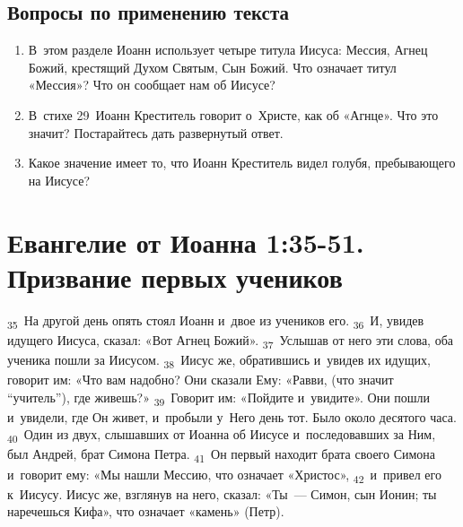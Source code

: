 \documentclass[a4paper,12pt]{article}
\begin{document}
\subsection*{Вопросы по применению текста} 
\begin{enumerate}
    \item В~этом разделе Иоанн использует четыре титула Иисуса: Мессия, Агнец Божий, крестящий Духом Святым, Сын Божий. Что означает титул «Мессия»? Что он сообщает нам об Иисусе? 
    
    \myline
    
    \myline
    \item В~стихе 29~Иоанн Креститель говорит о~Христе, как об «Агнце». Что это значит? Постарайтесь дать развернутый ответ. 
    
    \myline
    
    \myline
    \item Какое значение имеет то, что Иоанн Креститель видел голубя, пребывающего на Иисусе? 
    
    \myline
    
    \myline
\end{enumerate}



\section{Евангелие от Иоанна 1:35-51. Призвание первых учеников}

\textsubscript{35}~На другой день опять стоял Иоанн и~двое из учеников его. \textsubscript{36}~И, увидев идущего Иисуса, сказал: «Вот Агнец Божий». \textsubscript{37}~Услышав от него эти слова, оба ученика пошли за Иисусом. \textsubscript{38}~Иисус же, обратившись и~увидев их идущих, говорит им: «Что вам надобно? Они сказали Ему: «Равви, (что значит “учитель”), где живешь?» \textsubscript{39}~Говорит им: «Пойдите и~увидите». Они пошли и~увидели, где Он живет, и~пробыли у~Него день тот. Было около десятого часа. \textsubscript{40}~Один из двух, слышавших от Иоанна об Иисусе и~последовавших за Ним, был Андрей, брат Симона Петра. \textsubscript{41}~Он первый находит брата своего Симона и~говорит ему: «Мы нашли Мессию, что означает «Христос», \textsubscript{42}~и~привел его к~Иисусу. Иисус же, взглянув на него, сказал: «Ты~--- Симон, сын Ионин; ты наречешься Кифа», что означает «камень» (Петр). 
\end{document}
